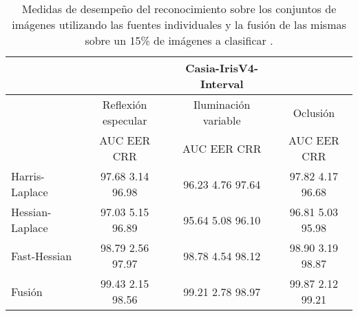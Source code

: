 \begin{table}[h]
\begin{center}
\begin{tabular}{@{}lccc@{}}
\toprule
&& Casia-IrisV4-Interval & \\ \hline
&Reflexión especular		&  	Iluminación variable		& Oclusión \\ \hline
&AUC  \phantom{aa} EER  \phantom{aa} CRR &  	AUC  \phantom{aa} EER  \phantom{aa} CRR		& AUC  \phantom{aa} EER  \phantom{aa} CRR \\ \hline
Harris-Laplace& 97.68 \phantom{aa} 3.14  \phantom{aa} 96.98 &  	96.23 \phantom{aa} 4.76  \phantom{aa}97.64		& 97.82 \phantom{aa} 4.17 \phantom{aa} 96.68 \\
Hessian-Laplace& 97.03 \phantom{aa} 5.15  \phantom{aa} 96.89 &  	95.64 \phantom{aa} 5.08 \phantom{aa} 96.10 & 96.81 \phantom{aa} 5.03 \phantom{aa} 95.98\\
Fast-Hessian& 98.79  \phantom{aa}2.56 \phantom{aa}  97.97 &  	98.78 \phantom{aa} 4.54 \phantom{aa}98.12		& 98.90  \phantom{aa}3.19 \phantom{aa} 98.87 \\
Fusión& 99.43 \phantom{aa} 2.15  \phantom{aa}98.56 &  	99.21  \phantom{aa}2.78 \phantom{aa} 98.97		& 99.87 \phantom{aa} 2.12  \phantom{aa}99.21 \\ \hline

\end{tabular}
\end{center}
\caption{Medidas de desempeño del reconocimiento sobre los conjuntos de imágenes utilizando las fuentes individuales y la fusión de las mismas sobre un 15\% de imágenes a clasificar .}
\label{my_tabla}
\end{table}

